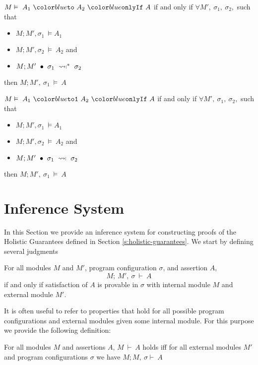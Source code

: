 \documentclass[acmsmall,review,anonymous]{acmart}\settopmatter{printfolios=true,printccs=false,printacmref=false}
\begin{document}
\begin{definition}
\label{def:oi}
$M \vDash\ \onlyIf {A_1}{A_2}{A}$ if and only if
$\forall M',\ \sigma_1,\ \sigma_2,$ such that 
\begin{itemize}
\item
$M ; M', \sigma_1\ \vDash A_1$
\item
$M ; M', \sigma_2\ \vDash\ A_2$ and
\item
$M ; M'\ \bullet\ \sigma_1\ \constrained^*\ \sigma_2$
\end{itemize}
then $M ; M',\ \sigma_1\ \vDash\ A$
\end{definition} 

\begin{definition}
\label{def:oi-single}
$M \vDash\ \onlyIfSingle {A_1}{A_2}{A}$ if and only if
$\forall M',\ \sigma_1,\ \sigma_2,$ such that 
\begin{itemize}
\item
$M ; M', \sigma_1\ \vDash A_1$
\item
$M ; M', \sigma_2\ \vDash\ A_2$ and
\item
$M ; M'\ \bullet\ \sigma_1\ \constrained\ \sigma_2$
\end{itemize}
then $M ; M',\ \sigma_1\ \vDash\ A$
\end{definition}


\section{Inference System}  

In this Section we provide an inference system for constructing 
proofs of the Holistic Guarantees defined in Section \ref{s:holistic-guarantees}. We start by defining several judgments
\begin{definition}
For all modules $M$ and $M'$, program configuration $\sigma$,
and \Chainmail assertion $A$,
$$M;\ M',\ \sigma\ \vdash\ A$$ 
if and only if satisfaction of $A$ is provable in $\sigma$ with internal module $M$ and external module $M'$.
\end{definition}
It is often useful to refer to \Chainmail properties that hold for all
possible program configurations and external modules given some internal module. For 
this purpose we provide the following definition:
\begin{definition}
For all modules $M$ and \Chainmail assertions $A$,
$M\ \vdash\ A$ holds
iff for all external modules $M'$ and program configurations $\sigma$ we have
$M; M,\ \sigma \vdash\ A$
\end{definition}
\end{document}
